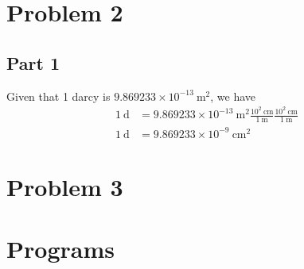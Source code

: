 \documentclass{article}
\begin{document}
\section{Problem 2}
\subsection{Part 1}
Given that 1 darcy is $9.869233 \times 10^{-13} \mathrm{\ m}^2$, we have
\begin{align}
    1 \mathrm{\ d} &= 9.869233 \times 10^{-13} \mathrm{\ m}^2 \frac{10^2 \mathrm{\ cm}}{1 \mathrm{\ m}} \frac{10^2 \mathrm{\ cm}}{1 \mathrm{\ m}} \\
    1 \mathrm{\ d} &= 9.869233 \times 10^{-9} \mathrm{\ cm}^2
\end{align}
%
%
%
\section{Problem 3}

\appendix
\section{Programs}



\end{document}
